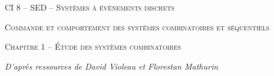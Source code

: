 \documentclass[11pt,oneside]{article}
\begin{document}
\pagestyle{fancy}
\renewcommand{\headrulewidth}{0pt}

\fancyhead{}

\fancyhead[C]{\rule{12cm}{.5pt}}


\renewcommand{\footrulewidth}{0.2pt}

\fancyfoot[C]{\footnotesize{\bfseries \thepage}}



\begin{center}
 \huge\textsc{CI 8 -- SED -- Systèmes à événements discrets}

 \large\textsc{Commande et comportement des systèmes combinatoires et séquentiels}
\end{center}

\begin{center}
 \LARGE\textsc{Chapitre 1 -- Étude des systèmes combinatoires}
\end{center}


\vspace{.5cm}
\begin{flushright}
\textit{D'après ressources de David Violeau et Florestan Mathurin}
\end{flushright}
\end{document}
